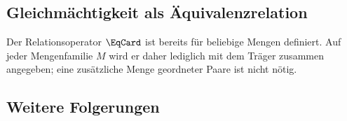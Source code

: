 \documentclass[main.tex]{subfiles}
\begin{document}
\subsection{Gleichmächtigkeit als Äquivalenzrelation}

Der Relationsoperator \(\EqCard\) ist bereits für beliebige Mengen definiert.
Auf jeder Mengenfamilie \(M\) wird er daher lediglich mit dem Träger
zusammen angegeben; eine zusätzliche Menge geordneter Paare ist nicht nötig.

\begin{tabproof}
\end{tabproof}

\subsection{Weitere Folgerungen}
\end{document}
